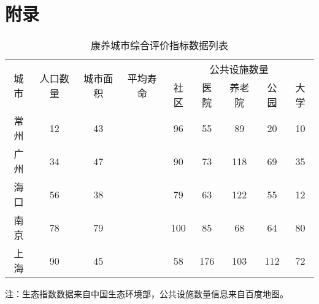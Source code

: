 \documentclass[12pt,a4paper]{article}
\begin{document}
\onecolumn
\newpage
\section*{附录}

\begin{table}[h]
  \centering
  \caption{康养城市综合评价指标数据列表}
  \begin{tabular}{c|c|cc|ccccc}
    \toprule[2pt]
    \multirow{2}{*}{城市} & \multirow{2}{*}{人口数量} & \multirow{2}{*}{城市面积}& \multirow{2}{*}{平均寿命}& \multicolumn{5}{c}{公共设施数量} \\
\cline{5-9}
& & & & 社区 & 医院 & 养老院 & 公园 & 大学 \\
    \midrule[1pt]
    常州 & 12 & 43 && 96 & 55 & 89 & 20 & 10 \\
    广州 & 34 & 47 && 90 & 73 & 118 & 69 & 35 \\
    海口 & 56 & 38 && 79 & 63 & 122 & 55 & 12 \\
    南京 & 78 & 79 && 100 & 85 & 68 & 64 & 80\\
    上海 & 90 & 45 && 58 & 176 & 103 & 112 & 72 \\
    \bottomrule[2pt]
  \end{tabular}

  \vspace{0.5em}
  {\footnotesize 注：生态指数数据来自中国生态环境部，公共设施数量信息来自百度地图。}
\end{table}
\end{document}
